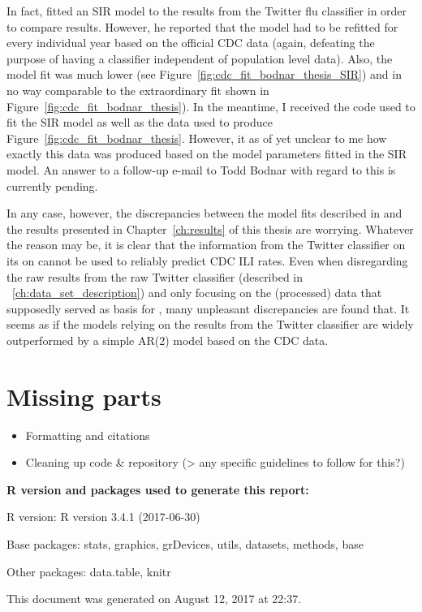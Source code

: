 \documentclass[11pt, a4paper,twoside]{report}\usepackage[]{graphicx}\usepackage[]{color}
\newcommand{\prog}[1]{\textsf{#1}}
\begin{document}
In fact, \citep{bodnar_data_2015} fitted an SIR model to the results from the Twitter flu classifier in order to compare results. However, he reported that the model had to be refitted for every individual year based on the official CDC data (again, defeating the purpose of having a classifier independent of population level data). Also, the model fit was much lower (see Figure~\ref{fig:cdc_fit_bodnar_thesis_SIR}) and in no way comparable to the extraordinary fit shown in Figure~\ref{fig:cdc_fit_bodnar_thesis}). In the meantime, I received the code used to fit the SIR model as well as the data used to produce Figure~\ref{fig:cdc_fit_bodnar_thesis}. However, it as of yet unclear to me how exactly this data was produced based on the model parameters fitted in the SIR model. An answer to a follow-up e-mail to Todd Bodnar with regard to this is currently pending.\newline

In any case, however, the discrepancies between the model fits described in \citep{bodnar_data_2015} and the results presented in Chapter~\ref{ch:results} of this thesis are worrying. Whatever the reason may be, it is clear that the information from the Twitter classifier on its on cannot be used to reliably predict CDC ILI rates. Even when disregarding the raw results from the raw Twitter classifier (described in ~\ref{ch:data_set_description}) and only focusing on the (processed) data that supposedly served as basis for \citep{bodnar_data_2015}, many unpleasant discrepancies are found that. It seems as if the models relying on the results from the Twitter classifier are widely outperformed by a simple AR(2) model based on the CDC data.

\section{Missing parts}

\begin{itemize}
\item Formatting and citations
\item Cleaning up code \& repository (> any specific guidelines to follow for this?)
\end{itemize}

\newpage



\newpage
{}


%

\vfill

\footnotesize

{\bf \prog{R} version and packages used to generate this report:}

\prog{R} version: \textsf{R version 3.4.1 (2017-06-30)}

Base packages: \textsf{stats, graphics, grDevices, utils, datasets, methods, base}

Other packages: \textsf{data.table, knitr}

This document was generated on August 12, 2017 at 22:37.
\end{document}
